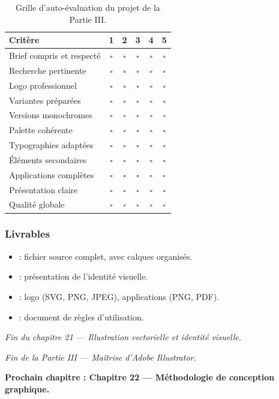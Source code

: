 \begin{table}[h!]
\centering
\begin{tabular}{@{}lccccc@{}}
\toprule
\textbf{Critère} & \textbf{1} & \textbf{2} & \textbf{3} & \textbf{4} & \textbf{5} \\
\midrule
Brief compris et respecté & \(\square\) & \(\square\) & \(\square\) & \(\square\) & \(\square\) \\
Recherche pertinente & \(\square\) & \(\square\) & \(\square\) & \(\square\) & \(\square\) \\
Logo professionnel & \(\square\) & \(\square\) & \(\square\) & \(\square\) & \(\square\) \\
Variantes préparées & \(\square\) & \(\square\) & \(\square\) & \(\square\) & \(\square\) \\
Versions monochromes & \(\square\) & \(\square\) & \(\square\) & \(\square\) & \(\square\) \\
Palette cohérente & \(\square\) & \(\square\) & \(\square\) & \(\square\) & \(\square\) \\
Typographies adaptées & \(\square\) & \(\square\) & \(\square\) & \(\square\) & \(\square\) \\
Éléments secondaires & \(\square\) & \(\square\) & \(\square\) & \(\square\) & \(\square\) \\
Applications complètes & \(\square\) & \(\square\) & \(\square\) & \(\square\) & \(\square\) \\
Présentation claire & \(\square\) & \(\square\) & \(\square\) & \(\square\) & \(\square\) \\
Qualité globale & \(\square\) & \(\square\) & \(\square\) & \(\square\) & \(\square\) \\
\bottomrule
\end{tabular}
\caption{Grille d'auto-évaluation du projet de la Partie III.}
\end{table}

\subsubsection*{Livrables}

\begin{itemize}
    \item {} : fichier source complet, avec calques organisés.
    \item {} : présentation de l'identité visuelle.
    \item {} : logo (SVG, PNG, JPEG), applications (PNG, PDF).
    \item {} : document de règles d'utilisation.
\end{itemize}

\vspace{2em}

\begin{center}
\textit{Fin du chapitre 21 --- Illustration vectorielle et identité visuelle.}

\vspace{1em}

\textit{Fin de la Partie III --- Maîtrise d'Adobe Illustrator.}

\vspace{1em}

\textbf{Prochain chapitre : Chapitre 22 --- Méthodologie de conception graphique.}
\end{center}